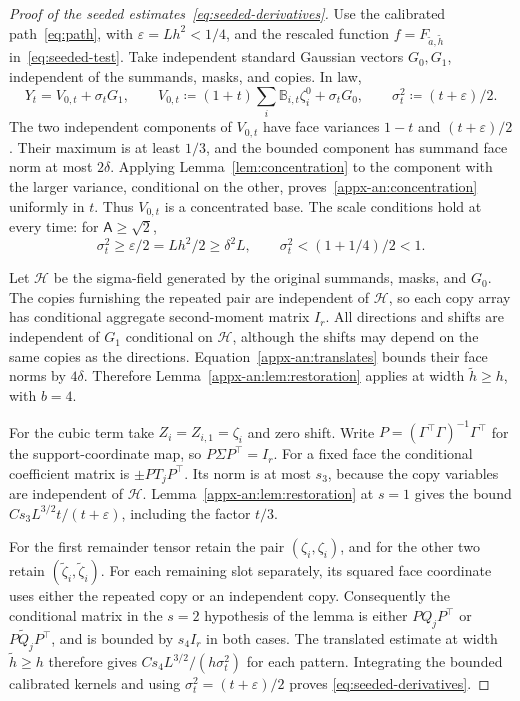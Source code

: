 \documentclass[11pt,letterpaper]{article}
\theoremstyle{remark}
\begin{document}
\begin{proof}[Proof of the seeded estimates~\eqref{eq:seeded-derivatives}]
Use the calibrated path~\eqref{eq:path}, with
\(\varepsilon=Lh^2<1/4\), and the rescaled function
\(f=F_{\widetilde a,\widetilde h}\) in~\eqref{eq:seeded-test}.
Take independent standard Gaussian vectors \(G_0,G_1\), independent
of the summands, masks, and copies. In law,
\begin{equation}
 Y_t=V_{0,t}+\sigma_tG_1,\qquad
 V_{0,t}\coloneqq(1+t)\sum_i\mathbb B_{i,t}\zeta_i^0+\sigma_tG_0,
 \qquad\sigma_t^2\coloneqq(t+\varepsilon)/2.
 \label{eq:seeded-gaussian-split}
\end{equation}
The two independent components of \(V_{0,t}\) have face variances
\(1-t\) and \((t+\varepsilon)/2\). Their maximum is at least
\(1/3\), and the bounded component has summand face norm at most
\(2\delta\). Applying Lemma~\ref{lem:concentration} to the
component with the larger variance, conditional on the other,
proves~\eqref{appx-an:concentration} uniformly in \(t\).
Thus \(V_{0,t}\) is a concentrated base. The scale conditions hold
at every time: for \(\mathsf A\ge\sqrt2\),
\[
 \sigma_t^2\ge\varepsilon/2=Lh^2/2\ge\delta^2L,
 \qquad \sigma_t^2<(1+1/4)/2<1.
\]

Let \(\mathcal H\) be the sigma-field generated by the original
summands, masks, and \(G_0\). The copies furnishing the repeated
pair are independent of \(\mathcal H\), so each copy array has
conditional aggregate second-moment matrix \(I_r\). All directions
and shifts are independent of \(G_1\) conditional on
\(\mathcal H\), although the shifts may depend on the same copies as the
directions. Equation~\eqref{appx-an:translates} bounds their face
norms by \(4\delta\). Therefore Lemma~\ref{appx-an:lem:restoration}
applies at width \(\widetilde h\ge h\), with \(b=4\).

For the cubic term take $Z_i=Z_{i,1}=\zeta_i$ and zero shift. Write $P=(\Gamma^\top\Gamma)^{-1}\Gamma^\top$ for the support-coordinate map, so $P\Sigma P^\top=I_r$. For a fixed face the conditional coefficient matrix is $\pm P T_j P^\top$. Its norm is at most $s_3$, because the copy variables are independent of $\mathcal H$. Lemma~\ref{appx-an:lem:restoration} at $s=1$ gives the bound $C s_3 L^{3/2}t/(t+\varepsilon)$, including the factor $t/3$.

For the first remainder tensor retain the pair $(\zeta_i,\zeta_i)$, and for the other two retain $(\widetilde\zeta_i,\widetilde\zeta_i)$. For each remaining slot separately, its squared face coordinate uses either the repeated copy or an independent copy. Consequently the conditional matrix in the $s=2$ hypothesis of the lemma is either $P Q_jP^\top$ or $P\widetilde Q_jP^\top$, and is bounded by $s_4 I_r$ in both cases. The translated estimate at width $\widetilde h\ge h$ therefore gives $Cs_4L^{3/2}/(h\sigma_t^2)$ for each pattern. Integrating the bounded calibrated kernels and using $\sigma_t^2=(t+\varepsilon)/2$ proves \eqref{eq:seeded-derivatives}.

\end{proof}
\end{document}
